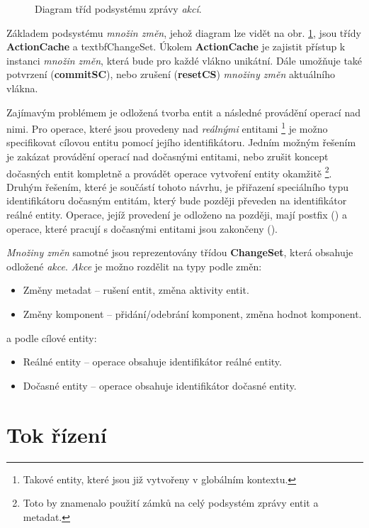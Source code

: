 \begin{figure}[H]
	\caption{Diagram tříd podsystému zprávy \emph{akcí}.}
	\label{Fig:DESActionDiag}
\end{figure}

Základem podsystému \emph{množin změn}, jehož diagram lze vidět na obr. \ref{Fig:DESActionDiag}, jsou třídy \textbf{ActionCache} a textbf{ChangeSet}. Úkolem \textbf{ActionCache} je zajistit přístup k instanci \emph{množin změn}, která bude pro každé vlákno unikátní. Dále umožňuje také potvrzení (\textbf{commitSC}), nebo zrušení (\textbf{resetCS}) \emph{množiny změn} aktuálního vlákna. 

Zajímavým problémem je odložená tvorba entit a následné provádění operací nad nimi. Pro operace, které jsou provedeny nad \emph{reálnými} entitami \footnote{Takové entity, které jsou již vytvořeny v globálním kontextu.} je možno specifikovat cílovou entitu pomocí jejího identifikátoru. Jedním možným řešením je zakázat provádění operací nad dočasnými entitami, nebo zrušit koncept dočasných entit kompletně a provádět operace vytvoření entity okamžitě \footnote{Toto by znamenalo použití zámků na celý podsystém zprávy entit a metadat.}. Druhým řešením, které je součástí tohoto návrhu, je přiřazení speciálního typu identifikátoru dočasným entitám, který bude později převeden na identifikátor reálné entity. Operace, jejíž provedení je odloženo na později, mají postfix  () a operace, které pracují s dočasnými entitami jsou zakončeny  ().

\emph{Množiny změn} samotné jsou reprezentovány třídou \textbf{ChangeSet}, která obsahuje odložené \emph{akce}. \emph{Akce} je možno rozdělit na typy podle změn:
\begin{itemize}
	\item Změny metadat -- rušení entit, změna aktivity entit.
	\item Změny komponent -- přidání/odebrání komponent, změna hodnot komponent.
\end{itemize}
\noindent a podle cílové entity: 
\begin{itemize}
	\item Reálné entity -- operace obsahuje identifikátor reálné entity.
	\item Dočasné entity -- operace obsahuje identifikátor dočasné entity.
\end{itemize}

\section{Tok řízení}

